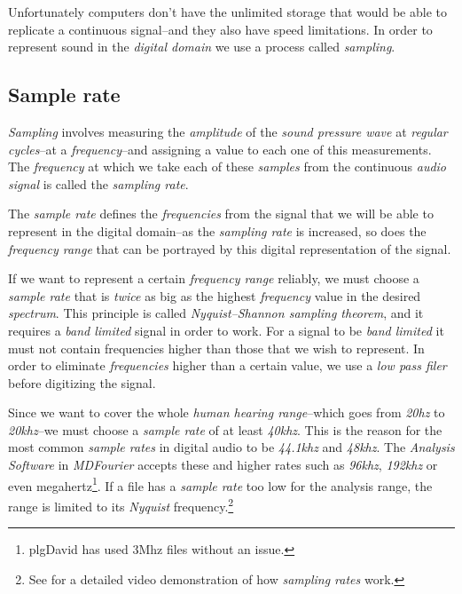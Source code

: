 \documentclass[10pt,a4paper]{report}
\newcommand{\hz}[1]{\textit{\mbox{#1\acrshort{hz}}}}
\newcommand{\khz}[1]{\textit{\mbox{#1\acrshort{khz}}}}
\begin{document}
Unfortunately computers don't have the unlimited storage that would be able to replicate a continuous signal--and they also have speed limitations. In order to represent sound in the \textit{digital domain} we use a process called \textit{sampling}. 

\subsection{Sample rate}

\textit{Sampling} involves measuring the \textit{amplitude} of the \textit{sound pressure wave} at \textit{regular cycles}--at a \textit{frequency}--and assigning a value to each one of this measurements. The \textit{frequency} at which we take each of these \textit{samples} from the continuous \textit{audio signal} is called the \textit{sampling rate}. 

The \textit{sample rate} defines the \textit{frequencies} from the signal that we will be able to represent in the digital domain--as the \textit{sampling rate} is increased, so does the \textit{frequency range} that can be portrayed by this digital representation of the signal. 

If we want to represent a certain \textit{frequency range} reliably, we must choose a \textit{sample rate} that is \textit{twice} as big as the highest \textit{frequency} value in the desired \textit{spectrum}. This principle is called  \textit{Nyquist–Shannon sampling theorem}, and it requires a \textit{band limited} signal in order to work. For a signal to be \textit{band limited} it must not contain frequencies higher than those that we wish to represent. In order to eliminate \textit{frequencies} higher than a certain value, we use a \textit{low pass filer} before digitizing the signal.

Since we want to cover the whole \textit{human hearing range}--which goes from \hz{20} to \khz{20}--we must choose a \textit{sample rate} of at least \khz{40}. This is the reason for the most common \textit{sample rates} in digital audio to be \khz{44.1} and \khz{48}. The \textit{Analysis Software} in \textit{MDFourier} accepts these and higher rates such as \khz{96}, \khz{192} or even megahertz\footnote{plgDavid has used 3Mhz files without an issue.}. If a file has a \textit{sample rate} too low for the analysis range, the range is limited to its \textit{Nyquist} frequency.\footnote{See \cite{MontyMontgomery} for a detailed video demonstration of how \textit{sampling rates} work.}
\end{document}
